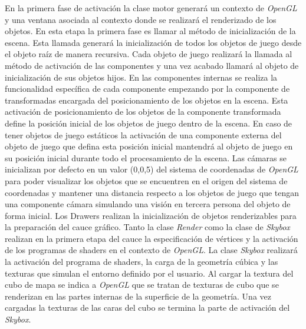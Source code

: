 \documentclass[a4paper]{book}
\begin{document}
En la primera fase de activación la clase motor generará un contexto de \textit{OpenGL} y una ventana asociada al contexto donde se
realizará el renderizado de los objetos. En esta etapa la primera fase es llamar al método de inicialización de la escena. Esta llamada
generará la inicialización de todos los objetos de juego desde el objeto raíz de manera recursiva. Cada objeto de juego realizará la
llamada al método de activación de las componentes y una vez acabado llamará al objeto de inicialización
de sus objetos hijos. En las componentes internas se realiza la funcionalidad específica de cada componente empezando por la componente
de transformadas encargada del posicionamiento de los objetos en la escena. Esta activación de posicionamiento de los objetos de la
componente transformada define la posición inicial de los objetos de juego dentro de la escena. En caso de tener objetos de juego estáticos
la activación de una componente externa del objeto de juego que defina esta posición inicial mantendrá al objeto de juego en su posición
inicial durante todo el procesamiento de la escena. Las cámaras se inicializan por defecto en un valor (0,0,5) del sistema de coordenadas de
\textit{OpenGL} para poder visualizar los objetos que se encuentren en el origen del sistema de coordenadas y mantener una distancia respecto
a los objetos de juego que tengan una componente cámara simulando una visión en tercera persona del objeto de forma inicial. Los Drawers
realizan la inicialización de objetos renderizables para la preparación del cauce gráfico. Tanto la clase \textit{Render}
como la clase de \textit{Skybox} realizan en la primera etapa del cauce la especificación de vértices y la activación de los programas de
shaders en el contexto de  \textit{OpenGL}. La clase \textit{Skybox} realizará la activación del programa de shaders, la carga de la geometría 
cúbica y las texturas que simulan el entorno definido por el usuario. Al cargar la textura del cubo de mapa se indica a \textit{OpenGL} 
que se tratan de texturas de cubo que se renderizan en las partes internas de la superficie de la geometría. Una vez cargadas la texturas
de las caras del cubo se termina la parte de activación del \textit{Skybox}.

\end{document}
